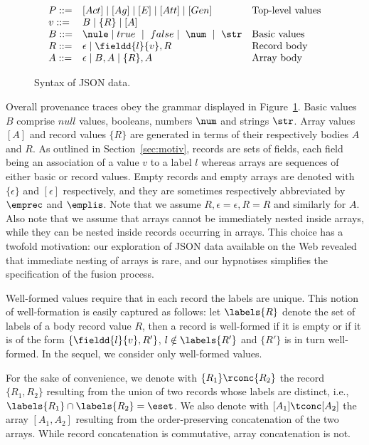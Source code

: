 \begin{figure}[ht]
\[
\begin{array}{lllllll}
P ::= & [Act] \mid [Ag] \mid [E] \mid [Att] \mid [Gen]  & \text{Top-level values} \\
v ::= & B \mid \{R\} \mid [A]  \\
B ::=	& \nule \mid true \ \mid \ false \mid \ \num \  \mid \ \str      & \text{Basic values}\\ 
R ::= & \epsilon \mid \fieldd{l}{v} , R   & \text{Record body} \\
A ::= &  \epsilon \mid B , A \mid \{R\} , A  & \text{Array body} \\
\end{array}
\]
\caption{Syntax of JSON data.}
\label{fig:datamodel}
\end{figure}

Overall provenance traces obey the  grammar displayed in Figure~\ref{fig:datamodel}.
Basic values $B$ comprise  $null$ values, booleans, numbers $\num$ and strings $\str$.
Array values $[A]$ and record values $\{R\}$ are generated in terms of their respectively bodies $A$ and $R$.
As outlined in Section~\ref{sec:motiv}, records are sets of fields, each field being an association of a value $v$ to a label $l$ whereas arrays are sequences of either basic or record values.
Empty records and empty arrays are  denoted with $\{\epsilon \}$ and $[ \epsilon ]$ respectively, and they are sometimes respectively abbreviated by $\emprec$ and $\emplis$. Note that we assume $R,\epsilon = \epsilon,R=R$ and similarly for $A$. Also note that we assume that arrays cannot be immediately nested inside arrays, while they can be nested inside records occurring in arrays. This choice has a twofold motivation: our exploration of JSON data available on the Web revealed that immediate nesting of arrays is rare, and our hypnotises simplifies the specification of the fusion process.


Well-formed \json\/ values require that in each record the labels are unique.
This notion of well-formation is easily captured as follows: let $\labels{R}$ denote the set of labels of a body record value $R$, then a record is well-formed if it is empty or if it is of the form $\{\fieldd{l}{v}, R'\}$,  $l \notin \labels{R'}$ and $\{R'\}$ is in turn well-formed. In the sequel, we consider only well-formed \json\/ values.

For the sake of convenience, we denote with $\{R_1\} \rconc \{R_2\}$ the record $\{R_1, R_2\}$ resulting from the union of two records whose labels are distinct, i.e., $\labels{R_1}\cap\labels{R_2}=\eset$.
We also denote  with $[A_1] \tconc [A_2]$ the array $[A_1, A_2]$ resulting from the order-preserving concatenation of the two arrays.
While record concatenation is commutative, array concatenation is not. 


